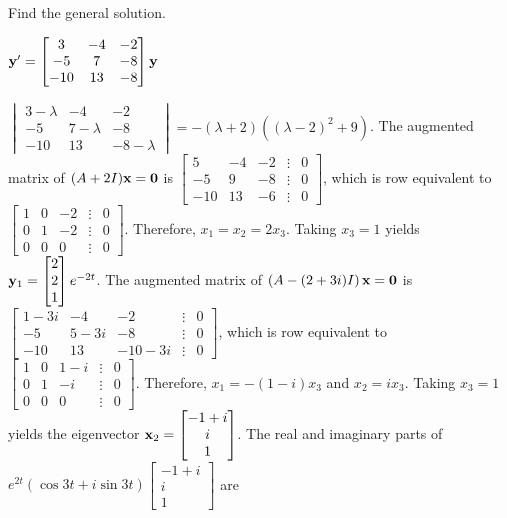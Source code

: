 \documentclass{ximera}
\begin{document}
 \begin{problem}\label{exer:10.6.14} 
 Find the general solution.
 
 $ {\bf y}'
= \begin{bmatrix}3&-4&-2\\-5&7&-8\\-10&13&-8\end{bmatrix}{\bf y}$

\begin{solution}
    $\begin{vmatrix}3-\lambda&-4&-2\\-5&7-\lambda&-8\\-10
&13&-8-\lambda\end{vmatrix}=-(\lambda+2)\left((\lambda-2)^2+9\right)$.
 The augmented matrix of $(A+2I){\bf x=0}$ is
$ \begin{bmatrix}5&-4&-2&\vdots&0\\-5&9&-8&\vdots&0\\
-10&13&-6&\vdots&0 \end{bmatrix}$,
which is row equivalent to
$ \begin{bmatrix} 1&0&-2&\vdots&0\\ 0&1&-2&
\vdots&0\\ 0&0&0&\vdots&0 \end{bmatrix}$.
Therefore,  $x_1=x_2=2x_3$.  Taking $x_3=1$ yields
${\bf y}_1= \begin{bmatrix}2\\2\\1 \end{bmatrix}e^{-2t}$.
The augmented matrix of
$\left(A-(2+3i)I\right){\bf x=0}$ is
$ \begin{bmatrix}1-3i&-4&-2&\vdots&0\\-5&5-3i&-8&\vdots&0\\
-10&13&-10-3i&\vdots&0 \end{bmatrix}$,
which is row equivalent to
$ \begin{bmatrix} 1&0&1-i&\vdots&0\\
0&1&-i&\vdots&0\\ 0&0&0&\vdots&0 \end{bmatrix}$.
Therefore,  $x_1=-(1-i)x_3$ and $x_2=ix_3$.
Taking $x_3=1$ yields the eigenvector
${\bf x}_2= \begin{bmatrix}-1+i\\i\\1 \end{bmatrix}$.
The real and imaginary parts of $e^{2t}(\cos3t+i\sin3t)
 \begin{bmatrix}-1+i\\i\\1 \end{bmatrix}$ are

\end{solution}
\end{problem}
\end{document}
